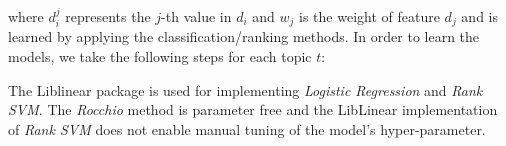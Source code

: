 where $d_{i}^{j}$ represents the $j$-th value in $d_{i}$ and ${w_{j}}$ is the weight of feature $d_{j}$ and is learned by applying the classification/ranking methods.
In order to learn the models, we take the following steps for each topic $t$:

The Liblinear \cite{liblinear} package is used for implementing \textit{Logistic Regression} and \textit{Rank SVM}. The \textit{Rocchio} method is parameter free and the LibLinear \cite{liblinear} implementation of \textit{Rank SVM} does not enable manual tuning of the model's hyper-parameter.

